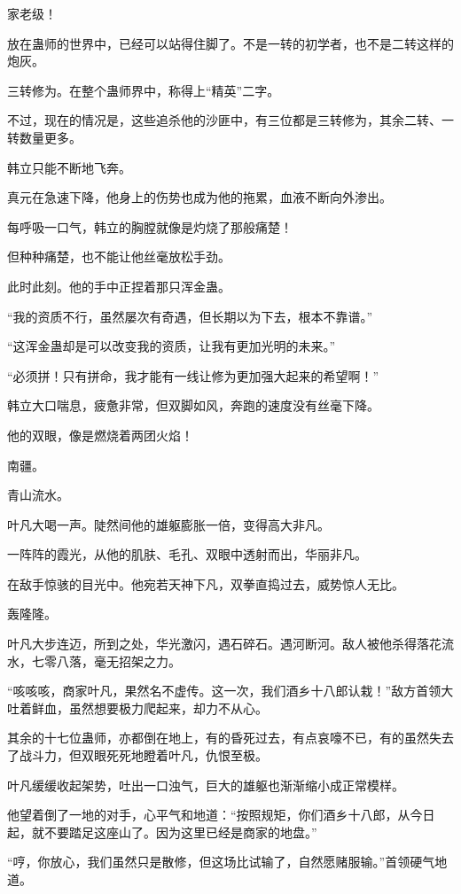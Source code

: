 \begin{this_body}
家老级！

放在蛊师的世界中，已经可以站得住脚了。不是一转的初学者，也不是二转这样的炮灰。

三转修为。在整个蛊师界中，称得上“精英”二字。

不过，现在的情况是，这些追杀他的沙匪中，有三位都是三转修为，其余二转、一转数量更多。

韩立只能不断地飞奔。

真元在急速下降，他身上的伤势也成为他的拖累，血液不断向外渗出。

每呼吸一口气，韩立的胸膛就像是灼烧了那般痛楚！

但种种痛楚，也不能让他丝毫放松手劲。

此时此刻。他的手中正捏着那只浑金蛊。

“我的资质不行，虽然屡次有奇遇，但长期以为下去，根本不靠谱。”

“这浑金蛊却是可以改变我的资质，让我有更加光明的未来。”

“必须拼！只有拼命，我才能有一线让修为更加强大起来的希望啊！”

韩立大口喘息，疲惫非常，但双脚如风，奔跑的速度没有丝毫下降。

他的双眼，像是燃烧着两团火焰！

南疆。

青山流水。

叶凡大喝一声。陡然间他的雄躯膨胀一倍，变得高大非凡。

一阵阵的霞光，从他的肌肤、毛孔、双眼中透射而出，华丽非凡。

在敌手惊骇的目光中。他宛若天神下凡，双拳直捣过去，威势惊人无比。

轰隆隆。

叶凡大步连迈，所到之处，华光激闪，遇石碎石。遇河断河。敌人被他杀得落花流水，七零八落，毫无招架之力。

“咳咳咳，商家叶凡，果然名不虚传。这一次，我们酒乡十八郎认栽！”敌方首领大吐着鲜血，虽然想要极力爬起来，却力不从心。

其余的十七位蛊师，亦都倒在地上，有的昏死过去，有点哀嚎不已，有的虽然失去了战斗力，但双眼死死地瞪着叶凡，仇恨至极。

叶凡缓缓收起架势，吐出一口浊气，巨大的雄躯也渐渐缩小成正常模样。

他望着倒了一地的对手，心平气和地道：“按照规矩，你们酒乡十八郎，从今日起，就不要踏足这座山了。因为这里已经是商家的地盘。”

“哼，你放心，我们虽然只是散修，但这场比试输了，自然愿赌服输。”首领硬气地道。


\end{this_body}
